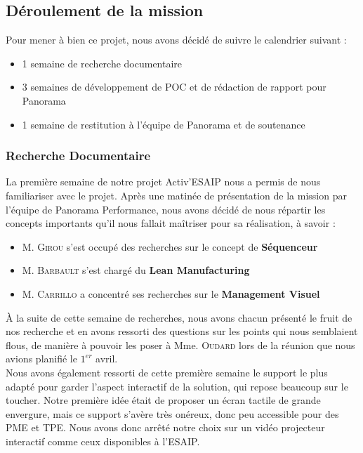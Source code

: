 \subsection{Déroulement de la mission}

Pour mener à bien ce projet, nous avons décidé de suivre le calendrier suivant :
\begin{itemize}
    \item 1 semaine de recherche documentaire
    \item 3 semaines de développement de POC et de rédaction de rapport pour Panorama 
    \item 1 semaine de restitution à l'équipe de Panorama et de soutenance
\end{itemize}


\subsubsection*{Recherche Documentaire}

La première semaine de notre projet Activ'ESAIP nous a permis de nous familiariser avec le projet. Après une matinée de présentation de la mission par l'équipe de Panorama Performance, nous avons décidé de nous répartir les concepts importants qu'il nous fallait maîtriser pour sa réalisation, à savoir : 
\begin{itemize}
    \item M. \textsc{Girou} s'est occupé des recherches sur le concept de \textbf{Séquenceur}
    \item M. \textsc{Barbault} s'est chargé du \textbf{Lean Manufacturing}
    \item M. \textsc{Carrillo} a concentré ses recherches sur le \textbf{Management Visuel}
\end{itemize}

À la suite de cette semaine de recherches, nous avons chacun présenté le fruit de nos recherche et en avons ressorti des questions sur les points qui nous semblaient flous, de manière à pouvoir les poser à Mme. \textsc{Oudard} lors de la réunion que nous avions planifié le $1^{er}$ avril.\\

Nous avons également ressorti de cette première semaine le support le plus adapté pour garder l'aspect interactif de la solution, qui repose beaucoup sur le toucher. Notre première idée était de proposer un écran tactile de grande envergure, mais ce support s'avère très onéreux, donc peu accessible pour des PME et TPE. Nous avons donc arrêté notre choix sur un vidéo projecteur interactif comme ceux disponibles à l'ESAIP. 

